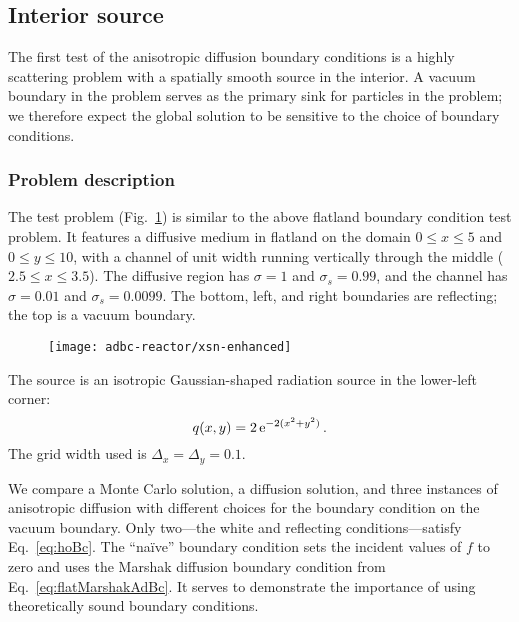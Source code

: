 \subsection{Interior source}

The first test of the anisotropic diffusion boundary conditions is a highly
scattering problem with a spatially smooth source in the interior. A vacuum
boundary in the problem serves as the primary sink for particles in the
problem; we therefore expect the global solution to be sensitive to the choice
of boundary conditions.

\subsubsection{Problem description}

The test problem (Fig.~\ref{fig:bcReactorProblem}) is similar to the above
flatland boundary condition test
problem. It features a diffusive medium in flatland on the domain $0
\le x \le 5$ and $0 \le y \le 10$, with a channel of unit width running
vertically through the middle ($2.5 \le x \le 3.5$). The diffusive region has
$\sigma=1$ and $\sigma_s=0.99$, and the channel has $\sigma=0.01$ and
$\sigma_s=0.0099$. The bottom, left, and right boundaries are reflecting; the
top is a vacuum boundary.

\begin{figure}[htb]
  \centering
  \texttt{[image: adbc-reactor/xsn-enhanced]}
  \label{fig:bcReactorProblem}
\end{figure}

The source is an isotropic Gaussian-shaped radiation source in the lower-left
corner:
\begin{equation*}
  q(x,y) = 2 \mathop{}\!\mathrm{e}^{-2 (x^2 + y^2) } \,.
\end{equation*}
The grid width used is $\Delta_x = \Delta_y = 0.1$.

We compare a Monte Carlo solution, a diffusion solution, and three instances of
anisotropic diffusion with different choices for the boundary condition on the
vacuum boundary. Only two---the white and reflecting
conditions---satisfy Eq.~\eqref{eq:hoBc}. The ``na\"ive'' boundary condition
sets the incident values of $f$ to zero and uses the Marshak diffusion boundary
condition from Eq.~\eqref{eq:flatMarshakAdBc}. It serves to demonstrate the
importance of using theoretically sound boundary conditions.

